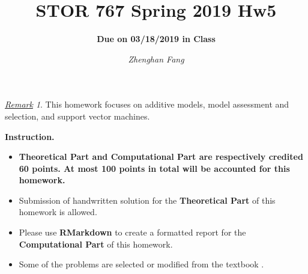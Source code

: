 \documentclass[10pt]{article}
\title{STOR 767 Spring 2019 Hw5}
\subtitle{\textbf{Due on 03/18/2019 in Class}}
\author{\it Zhenghan Fang}
\date{}
\theoremstyle{definition}
\theoremstyle{remark}
\newtheorem*{rmk}{\underline{Remark}}
\begin{document}
	\maketitle
	

\begin{rmk}
	This homework focuses on additive models, model assessment and selection, and support vector machines. 
\end{rmk}

\noindent \textbf{Instruction.}
\begin{itemize}
	\item {\bf Theoretical Part and Computational Part are respectively credited 60 points. At most 100 points in total will be accounted for this homework.}
	
	\item Submission of handwritten solution for the \textbf{Theoretical Part} of this homework is allowed.
	
	\item Please use \textbf{RMarkdown} to create a formatted report for the \textbf{Computational Part} of this homework. 

	\item Some of the problems are selected or modified from the textbook \citep{friedman2009elements}.
	
\end{itemize}
\end{document}

